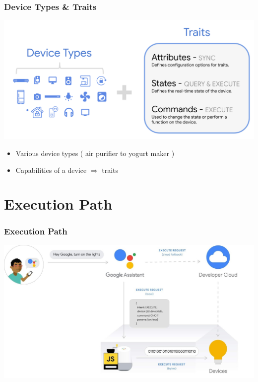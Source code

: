 \documentclass{beamer}
\begin{document}
\begin{frame}
\frametitle{Device Types \& Traits}
\begin{center}
\includegraphics[scale=0.2]{pictures/state_commands.png} 
\end{center}
\begin{itemize}
\item Various device types ( air purifier to yogurt maker )
\item Capabilities of a device $\Rightarrow$ traits
\end{itemize}
\end{frame}


\section{Execution Path}

\begin{frame}
\frametitle{Execution Path}
\begin{center}
\includegraphics[scale=0.2]{pictures/execution-path.png}
\end{center}
\end{frame}
\end{document}
